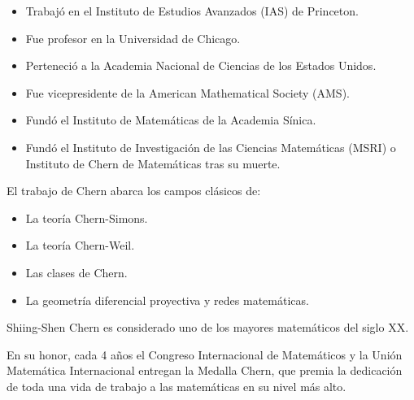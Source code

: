 \documentclass[12pt, aspectratio=169]{beamer} %
\begin{document}
		\begin{frame}
			\begin{itemize}
				\item Trabajó en el Instituto de Estudios Avanzados (IAS) de Princeton.
				\item Fue profesor en la Universidad de Chicago.
				\item Perteneció a la Academia Nacional de Ciencias de los Estados Unidos.
				\item Fue vicepresidente de la American Mathematical Society (AMS).
				\item Fundó el Instituto de Matemáticas de la Academia Sínica.
				\item Fundó el Instituto de Investigación de las Ciencias Matemáticas (MSRI) o Instituto de Chern de
				Matemáticas tras su muerte.
			\end{itemize}
			
			\pause
			
			El trabajo de Chern abarca los campos clásicos de:
			\begin{itemize}
				\item La teoría Chern-Simons.
				\item La teoría Chern-Weil.
				\item Las clases de Chern.
				\item La geometría diferencial proyectiva y redes matemáticas.
			\end{itemize}
		\end{frame}	

		\begin{frame}
			Shiing-Shen Chern es considerado uno de los mayores matemáticos del siglo XX.
			
			En su honor, cada 4 años el Congreso Internacional de Matemáticos y la Unión Matemática Internacional entregan
			la Medalla Chern, que premia la dedicación de toda una vida de trabajo a las matemáticas en su nivel más alto.
		\end{frame}
		
\end{document}

